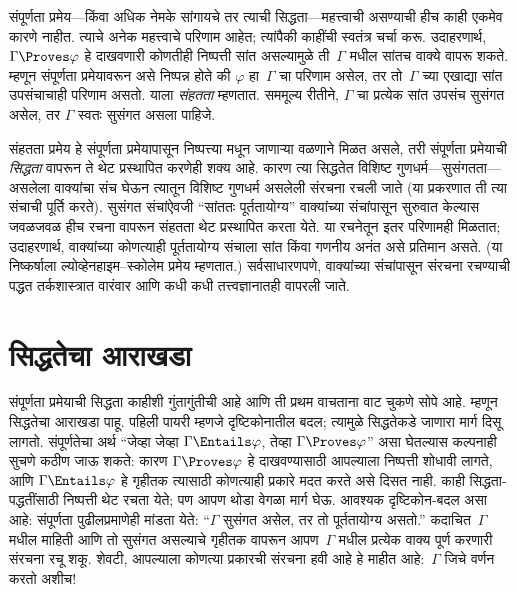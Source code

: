 संपूर्णता प्रमेय---किंवा अधिक नेमके सांगायचे तर त्याची सिद्धता---महत्त्वाची
असण्याची हीच काही एकमेव कारणे नाहीत. त्याचे अनेक महत्त्वाचे परिणाम आहेत;
त्यांपैकी काहींची स्वतंत्र चर्चा करू. उदाहरणार्थ, $\Gamma \Proves \varphi$ हे
दाखवणारी कोणतीही निष्पत्ती सांत असल्यामुळे ती~$\Gamma$ मधील सांतच
वाक्ये वापरू शकते. म्हणून संपूर्णता प्रमेयावरून असे निष्पन्न होते की
$\varphi$ हा~$\Gamma$ चा परिणाम असेल, तर तो~$\Gamma$ च्या एखाद्या सांत उपसंचाचाही
परिणाम असतो. याला \emph{संहतता} म्हणतात. सममूल्य रीतीने, $\Gamma$ चा प्रत्येक
सांत उपसंच सुसंगत असेल, तर $\Gamma$ स्वतः सुसंगत असला पाहिजे.

संहतता प्रमेय हे संपूर्णता प्रमेयापासून निष्पत्त्या मधून जाणाऱ्या वळणाने
मिळत असले, तरी संपूर्णता प्रमेयाची \emph{सिद्धता} वापरून ते थेट प्रस्थापित
करणेही शक्य आहे. कारण त्या सिद्धतेत विशिष्ट गुणधर्म---सुसंगतता---असलेला
वाक्यांचा संच घेऊन त्यातून विशिष्ट गुणधर्म असलेली संरचना
रचली जाते (या प्रकरणात ती त्या संचाची पूर्ति करते). सुसंगत संचांऐवजी
``सांततः पूर्ततायोग्य'' वाक्यांच्या संचांपासून सुरुवात केल्यास जवळजवळ
हीच रचना वापरून संहतता थेट प्रस्थापित करता येते.
या रचनेतून इतर परिणामही मिळतात; उदाहरणार्थ, वाक्यांच्या
  कोणत्याही पूर्ततायोग्य संचाला सांत किंवा गणनीय अनंत असे प्रतिमान असते.
  (या निष्कर्षाला ल्योव्हेनहाइम--स्कोलेम प्रमेय म्हणतात.) सर्वसाधारणपणे,
  वाक्यांच्या संचांपासून संरचना रचण्याची पद्धत तर्कशास्त्रात
  वारंवार आणि कधी कधी तत्त्वज्ञानातही वापरली जाते.












\section{सिद्धतेचा आराखडा}\label{fol:com:out:sec}

संपूर्णता प्रमेयाची सिद्धता काहीशी गुंतागुंतीची आहे आणि ती प्रथम वाचताना
वाट चुकणे सोपे आहे. म्हणून सिद्धतेचा आराखडा पाहू. पहिली पायरी म्हणजे
दृष्टिकोनातील बदल; त्यामुळे सिद्धतेकडे जाणारा मार्ग दिसू लागतो. संपूर्णतेचा
अर्थ “जेव्हा जेव्हा $\Gamma \Entails \varphi$, तेव्हा $\Gamma \Proves \varphi$”
असा घेतल्यास कल्पनाही सुचणे कठीण जाऊ शकते: कारण $\Gamma \Proves \varphi$ हे
दाखवण्यासाठी आपल्याला निष्पत्ती शोधावी लागते, आणि $\Gamma \Entails
\varphi$ हे गृहीतक त्यासाठी कोणत्याही प्रकारे मदत करते असे दिसत नाही. काही
सिद्धता-पद्धतींसाठी निष्पत्ती थेट रचता येते; पण आपण थोडा वेगळा मार्ग
घेऊ. आवश्यक दृष्टिकोन-बदल असा आहे: संपूर्णता पुढीलप्रमाणेही मांडता येते:
“$\Gamma$ सुसंगत असेल, तर तो पूर्ततायोग्य असतो.” कदाचित~$\Gamma$ मधील
माहिती आणि तो सुसंगत असल्याचे गृहीतक वापरून आपण~$\Gamma$ मधील प्रत्येक
वाक्य पूर्ण करणारी
संरचना रचू शकू. शेवटी, आपल्याला
कोणत्या प्रकारची संरचना हवी आहे हे
माहीत आहे:~$\Gamma$ जिचे वर्णन करतो अशीच!{}


